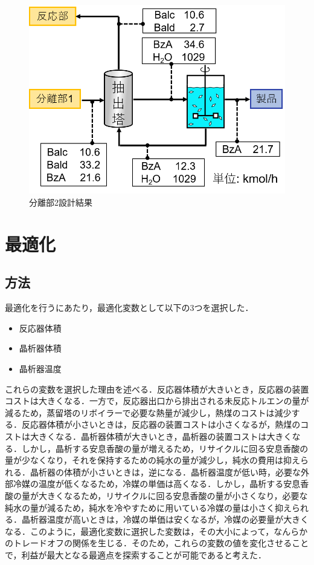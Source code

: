 \documentclass[a4j]{jsreport}
\begin{document}
\begin{figure}[htbp]
    \begin{center}
        \includegraphics[scale=0.7]{Separion2Conclusion.png}
        \caption{分離部2設計結果}
        \label{分離部2設計結果}
    \end{center}
\end{figure}

\newpage
\chapter{最適化}
\section{方法}
最適化を行うにあたり，最適化変数として以下の3つを選択した．
\begin{itemize}
  \item 反応器体積
  \item 晶析器体積
  \item 晶析器温度
\end{itemize}

これらの変数を選択した理由を述べる．反応器体積が大きいとき，反応器の装置コストは大きくなる．一方で，反応器出口から排出される未反応トルエンの量が減るため，蒸留塔のリボイラーで必要な熱量が減少し，熱煤のコストは減少する．反応器体積が小さいときは，反応器の装置コストは小さくなるが，熱煤のコストは大きくなる．晶析器体積が大きいとき，晶析器の装置コストは大きくなる．しかし，晶析する安息香酸の量が増えるため，リサイクルに回る安息香酸の量が少なくなり，それを保持するための純水の量が減少し，純水の費用は抑えられる．晶析器の体積が小さいときは，逆になる．晶析器温度が低い時，必要な外部冷媒の温度が低くなるため，冷媒の単価は高くなる．しかし，晶析する安息香酸の量が大きくなるため，リサイクルに回る安息香酸の量が小さくなり，必要な純水の量が減るため，純水を冷やすために用いている冷媒の量は小さく抑えられる．晶析器温度が高いときは，冷媒の単価は安くなるが，冷媒の必要量が大きくなる．このように，最適化変数に選択した変数は，その大小によって，なんらかのトレードオフの関係を生じる．そのため，これらの変数の値を変化させることで，利益が最大となる最適点を探索することが可能であると考えた．
\end{document}
